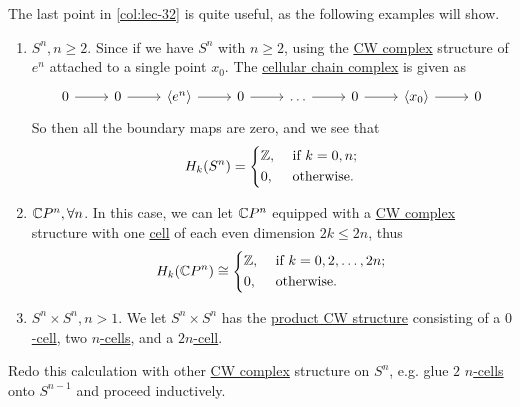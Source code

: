 \begin{eg}
	The last point in \autoref{col:lec-32} is quite useful, as the following examples will show.
	\begin{enumerate}
		\item \(S^n, n \geq 2\). Since if we have \(S^n\) with \(n \geq 2\), using the \hyperref[def:CW-Complex]{CW complex} structure of
		      \(e^n\) attached to a single point \(x_0\). The \hyperref[def:cellular-chain-complex]{cellular chain complex} is given as
		      \[
			      \begin{tikzcd}
				      0 & 0 & {\left<e^n\right>} & 0 & \ldots & 0 & {\left<x_0\right>} & 0
				      \arrow[from=1-1, to=1-2]
				      \arrow[from=1-2, to=1-3]
				      \arrow[from=1-3, to=1-4]
				      \arrow[from=1-4, to=1-5]
				      \arrow[from=1-5, to=1-6]
				      \arrow[from=1-6, to=1-7]
				      \arrow[from=1-7, to=1-8]
			      \end{tikzcd}
		      \]
		      So then all the boundary maps are zero, and we see that
		      \[
			      H_k(S^n) = \begin{dcases}
				      \mathbb{\MakeUppercase{z}}, & \text{ if } k=0, n ; \\
				      0,                          & \text{ otherwise}.
			      \end{dcases}
		      \]
		\item \(\mathbb{\MakeUppercase{c}} P^n, \forall n\). In this case, we can let \(\mathbb{\MakeUppercase{c}} P^n\) equipped with a
		      \hyperref[def:CW-Complex]{CW complex} structure with one \hyperref[def:cell]{cell} of each even dimension \(2k \leq 2n\), thus
		      \[
			      H_{k}(\mathbb{\MakeUppercase{c}} P^n) \cong \begin{dcases}
				      \mathbb{\MakeUppercase{z}}, & \text{ if } k = 0, 2, \ldots , 2n; \\
				      0,                          & \text{ otherwise}.
			      \end{dcases}
		      \]
		\item \(S^n \times S^n, n > 1\). We let \(S^n \times S^n\) has the \hyperref[CW-complex-product]{product CW structure} consisting
		      of a \hyperref[def:cell]{\(0\)-cell}, two \hyperref[def:cell]{\(n\)-cells}, and a \hyperref[def:cell]{\(2n\)-cell}.
	\end{enumerate}
\end{eg}

\begin{exercise}
	Redo this calculation with other \hyperref[def:CW-Complex]{CW complex} structure on \(S^n\), e.g. glue \(2\) \hyperref[def:cell]{\(n\)-cells} onto \(S^{n - 1}\) and proceed inductively.
\end{exercise}